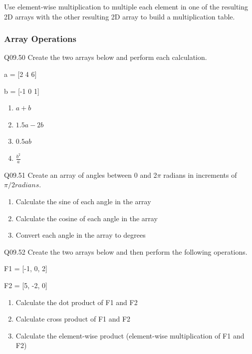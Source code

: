 \documentclass{book}
\begin{document}
Use element-wise multiplication to multiple each element in one of the
resulting 2D arrays with the other resulting 2D array to build a
multiplication table.
    




    
        \subsubsection{Array Operations}\label{array-operations}

Q09.50 Create the two arrays below and perform each calculation.

a = {[}2 4 6{]}

b = {[}-1 0 1{]}

\begin{enumerate}
\def\labelenumi{(\alph{enumi})}
\item
  \(a + b\)
\item
  \(1.5a -2b\)
\item
  \(0.5ab\)
\item
  \(\frac{b^2}{a}\)
\end{enumerate}

Q09.51 Create an array of angles between 0 and 2\(\pi\) radians in
increments of \(\pi/2 radians\).

\begin{enumerate}
\def\labelenumi{(\alph{enumi})}
\item
  Calculate the sine of each angle in the array
\item
  Calculate the cosine of each angle in the array
\item
  Convert each angle in the array to degrees
\end{enumerate}

Q09.52 Create the two arrays below and then perform the following
operations.

F1 = {[}-1, 0, 2{]}

F2 = {[}5, -2, 0{]}

\begin{enumerate}
\def\labelenumi{(\alph{enumi})}
\item
  Calculate the dot product of F1 and F2
\item
  Calculate cross product of F1 and F2
\item
  Calculate the element-wise product (element-wise multiplication of F1
  and F2)
\end{enumerate}
    
\end{document}
